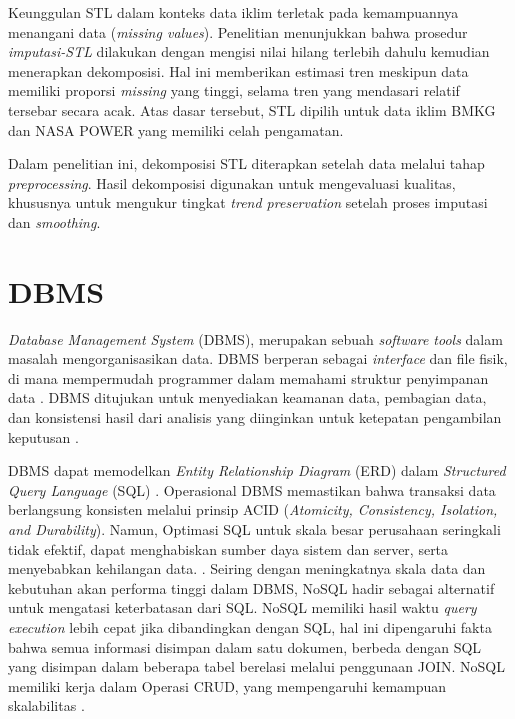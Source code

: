 Keunggulan STL dalam konteks data iklim terletak pada kemampuannya menangani data (\textit{missing values}). Penelitian \cite{kwok2023} menunjukkan bahwa prosedur \textit{imputasi-STL} dilakukan dengan mengisi nilai hilang terlebih dahulu kemudian menerapkan dekomposisi. Hal ini memberikan estimasi tren meskipun data memiliki proporsi \textit{missing} yang tinggi, selama tren yang mendasari relatif tersebar secara acak. Atas dasar tersebut, STL dipilih untuk data iklim BMKG dan NASA POWER yang memiliki celah pengamatan.

Dalam penelitian ini, dekomposisi STL diterapkan setelah data melalui tahap \textit{preprocessing}. Hasil dekomposisi digunakan untuk mengevaluasi kualitas, khususnya untuk mengukur tingkat \textit{trend preservation} setelah proses imputasi dan \textit{smoothing}.

\section{DBMS}
\textit{Database Management System} (DBMS), merupakan sebuah \textit{software tools} dalam masalah mengorganisasikan data. DBMS berperan sebagai \textit{interface} dan file fisik, di mana mempermudah programmer dalam memahami struktur penyimpanan data \citep{susanto2019}. DBMS ditujukan untuk menyediakan keamanan data, pembagian data, dan konsistensi hasil dari analisis yang diinginkan untuk ketepatan pengambilan keputusan \citep{sabrina2023}.

DBMS dapat memodelkan \textit{Entity Relationship Diagram} (ERD) dalam \textit{Structured Query Language} (SQL) \citep{hoffman2001}. Operasional DBMS memastikan bahwa transaksi data berlangsung konsisten melalui prinsip ACID (\textit{Atomicity, Consistency, Isolation, and Durability}). Namun, Optimasi SQL untuk skala besar perusahaan seringkali tidak efektif, dapat menghabiskan sumber daya sistem dan server, serta menyebabkan kehilangan data. \citep{khan2022}. Seiring dengan meningkatnya skala data dan kebutuhan akan performa tinggi dalam DBMS, NoSQL hadir sebagai alternatif untuk mengatasi keterbatasan dari SQL. NoSQL memiliki hasil waktu \textit{query execution} lebih cepat jika dibandingkan dengan SQL, hal ini dipengaruhi fakta bahwa semua informasi disimpan dalam satu dokumen, berbeda dengan SQL yang disimpan dalam beberapa tabel berelasi melalui penggunaan JOIN. NoSQL memiliki kerja dalam Operasi CRUD, yang mempengaruhi kemampuan skalabilitas \citep{rade2022}.

